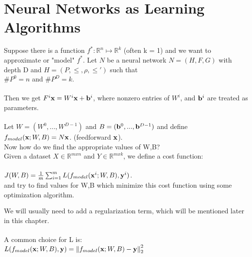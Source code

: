 \section{Neural Networks as Learning Algorithms}
Suppose there is a function $f^{*}:\mathbb{R}^{n} \mapsto \mathbb{R}^{k}$ (often k = 1) and we want to approximate or "model" $f^{*}$. Let $N$ be a neural network $N = (H,F,G)$ with depth D and $H = (P, \leq , \rho , \leq' )$ such that\\
 $\#P^{0} = n$ and $\#P^{D} = k$.\\
 \\
 Then we get $F^{i}{\vx} = W^{i}{\vx} + {\vb}^{i}$, where nonzero entries of $W^{i}$, and ${\vb}^{i}$ are treated as parameters.\\
 \\
 Let $W = (W^{0},...,W^{D-1})$ and $B = ({\vb}^{0},...,{\vb}^{D-1})$ and define $f_{model}({\vx};W,B) = N{\vx}$. (feedforward ${\vx}$).\\
 Now how do we find the appropriate values of W,B?\\
 Given a dataset $X \in \mathbb{R}^{mxn}$ and $Y \in \mathbb{R}^{mxk}$, we define a cost function:\\
\\
 $J(W,B) = \frac{1}{m} \sum_{i=1}^{m} L(f_{model}({\vx}^{i};W,B),{\vy}^{i})$.\\
and try to find values for W,B which minimize this cost function using some optimization algorithm.\\
\begin{note}
We will usually need to add a regularization term, which will be mentioned later in this chapter.\\
\\
A common choice for L is:\\
$L(f_{model}({\vx};W,B),{\vy}) = \norm{f_{model}({\vx};W,B) - {\vy}}_{2}^{2}$\\
\end{note}

